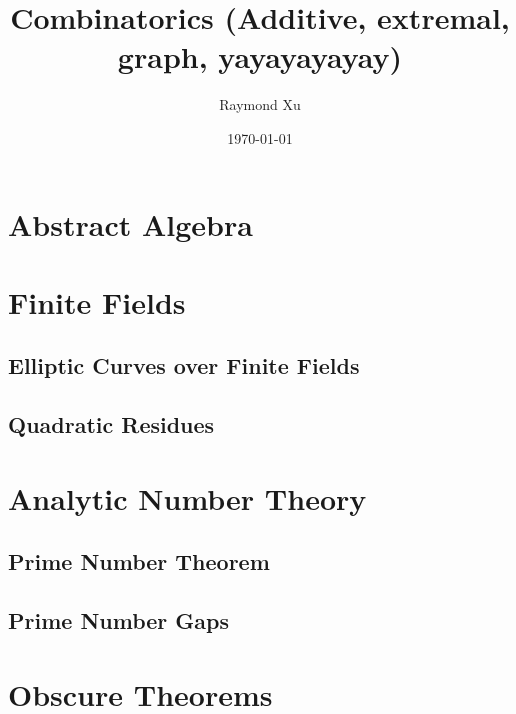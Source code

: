 \documentclass[11pt]{scrartcl}
\theoremstyle{plain} %
\theoremstyle{definition}
\theoremstyle{remark}
\theoremstyle{empty}
\theoremstyle{empty}
\theoremstyle{empty}
\theoremstyle{empty}
\theoremstyle{empty}
\theoremstyle{empty}
\theoremstyle{empty}
\theoremstyle{empty}
\begin{document}



\title{Combinatorics (Additive, extremal, graph, yayayayayay)}
\author{Raymond Xu}
\date{\today}
\maketitle

\begin{abstract}
\end{abstract}

\tableofcontents

\eject

\section{Abstract Algebra}

\section{Finite Fields}

\subsection{Elliptic Curves over Finite Fields}

\subsection{Quadratic Residues}

\section{Analytic Number Theory}

\subsection{Prime Number Theorem}

\subsection{Prime Number Gaps}

\section{Obscure Theorems}

\begin{lemma}
    
\end{lemma}
\end{document}
